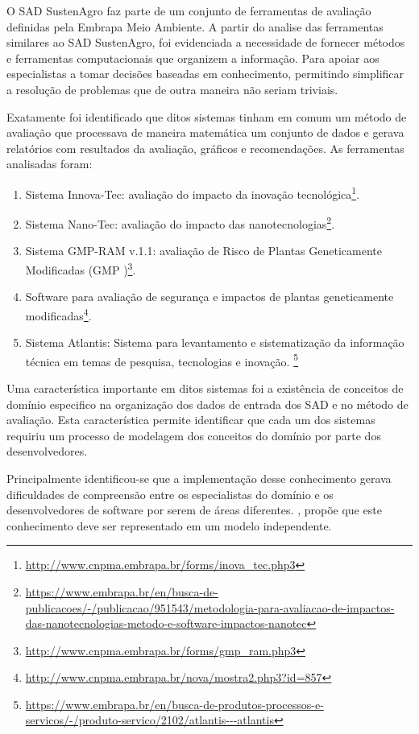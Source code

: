 O SAD SustenAgro faz parte de um conjunto de ferramentas de avaliação
definidas pela Embrapa Meio Ambiente. A partir do analise das ferramentas
similares ao SAD SustenAgro, foi evidenciada a necessidade de fornecer
métodos e ferramentas computacionais que organizem a informação. Para
apoiar aos especialistas a tomar decisões baseadas em conhecimento,
permitindo simplificar a resolução de problemas que de outra maneira
não seriam triviais. 

Exatamente foi identificado que ditos sistemas tinham em comum um
método de avaliação que processava de maneira matemática um conjunto
de dados e gerava relatórios com resultados da avaliação, gráficos
e recomendações. As ferramentas analisadas foram:
\begin{enumerate}
\item Sistema Innova-Tec: avaliação do impacto da inovação tecnológica\footnote{\url{http://www.cnpma.embrapa.br/forms/inova_tec.php3}}.
\item Sistema Nano-Tec: avaliação do impacto das nanotecnologias\footnote{\url{https://www.embrapa.br/en/busca-de-publicacoes/-/publicacao/951543/metodologia-para-avaliacao-de-impactos-das-nanotecnologias-metodo-e-software-impactos-nanotec} }.
\item Sistema GMP-RAM v.1.1: avaliação de Risco de Plantas Geneticamente
Modificadas (GMP )\footnote{\url{http://www.cnpma.embrapa.br/forms/gmp_ram.php3}}.
\item Software para avaliação de segurança e impactos de plantas geneticamente
modificadas\footnote{\url{http://www.cnpma.embrapa.br/nova/mostra2.php3?id=857}}.
\item Sistema Atlantis: Sistema para levantamento e sistematização da informação
técnica em temas de pesquisa, tecnologias e inovação. \footnote{\url{https://www.embrapa.br/en/busca-de-produtos-processos-e-servicos/-/produto-servico/2102/atlantis---atlantis}}
\end{enumerate}
Uma característica importante em ditos sistemas foi a existência de
conceitos de domínio especifico na organização dos dados de entrada
dos SAD e no método de avaliação. Esta característica permite identificar
que cada um dos sistemas requiriu um processo de modelagem dos conceitos
do domínio por parte dos desenvolvedores. 

Principalmente identificou-se que a implementação desse conhecimento
gerava dificuldades de compreensão entre os especialistas do domínio
e os desenvolvedores de software por serem de áreas diferentes. \citet{Evans:2003:DDT:861502},
propõe que este conhecimento deve ser representado em um modelo independente.

